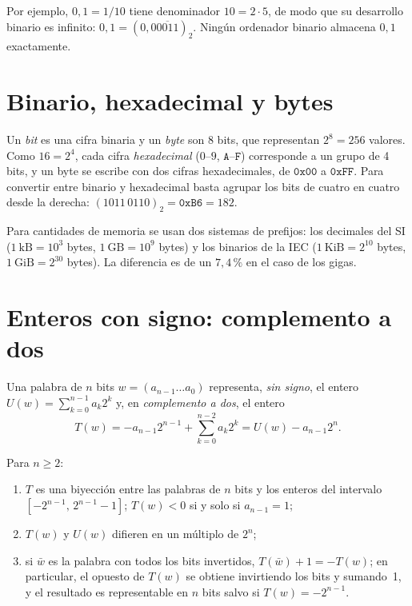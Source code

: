 Por ejemplo, $0{,}1=1/10$ tiene denominador $10=2\cdot5$, de modo que su desarrollo binario es infinito: $0{,}1=(0{,}0\overline{0011})_2$. Ningún ordenador binario almacena $0{,}1$ exactamente.

\section{Binario, hexadecimal y bytes}

Un \emph{bit} es una cifra binaria y un \emph{byte} son 8 bits, que representan $2^8=256$ valores. Como $16=2^4$, cada cifra \emph{hexadecimal} ($0$--$9$, $\texttt{A}$--$\texttt{F}$) corresponde a un grupo de 4 bits, y un byte se escribe con dos cifras hexadecimales, de $\texttt{0x00}$ a $\texttt{0xFF}$. Para convertir entre binario y hexadecimal basta agrupar los bits de cuatro en cuatro desde la derecha: $(1011\,0110)_2=\texttt{0xB6}=182$.

Para cantidades de memoria se usan dos sistemas de prefijos: los decimales del SI ($1\ \text{kB}=10^3$ bytes, $1\ \text{GB}=10^9$ bytes) y los binarios de la IEC ($1\ \text{KiB}=2^{10}$ bytes, $1\ \text{GiB}=2^{30}$ bytes). La diferencia es de un $7{,}4\,\%$ en el caso de los gigas.

\section{Enteros con signo: complemento a dos}

\begin{definicion}\label{def:c2}
Una palabra de $n$ bits $w=(a_{n-1}\dots a_0)$ representa, \emph{sin signo}, el entero $U(w)=\sum_{k=0}^{n-1}a_k2^k$ y, en \emph{complemento a dos}, el entero
\[
T(w)=-a_{n-1}2^{n-1}+\sum_{k=0}^{n-2}a_k2^k=U(w)-a_{n-1}2^n.
\]
\end{definicion}

\begin{teorema}\label{teo:c2}
Para $n\ge2$:
\begin{enumerate}
  \item $T$ es una biyección entre las palabras de $n$ bits y los enteros del intervalo $[-2^{n-1},\,2^{n-1}-1]$; $T(w)<0$ si y solo si $a_{n-1}=1$;
  \item $T(w)$ y $U(w)$ difieren en un múltiplo de $2^n$;
  \item si $\bar w$ es la palabra con todos los bits invertidos, $T(\bar w)+1=-T(w)$; en particular, el opuesto de $T(w)$ se obtiene invirtiendo los bits y sumando~1, y el resultado es representable en $n$ bits salvo si $T(w)=-2^{n-1}$.
\end{enumerate}
\end{teorema}

